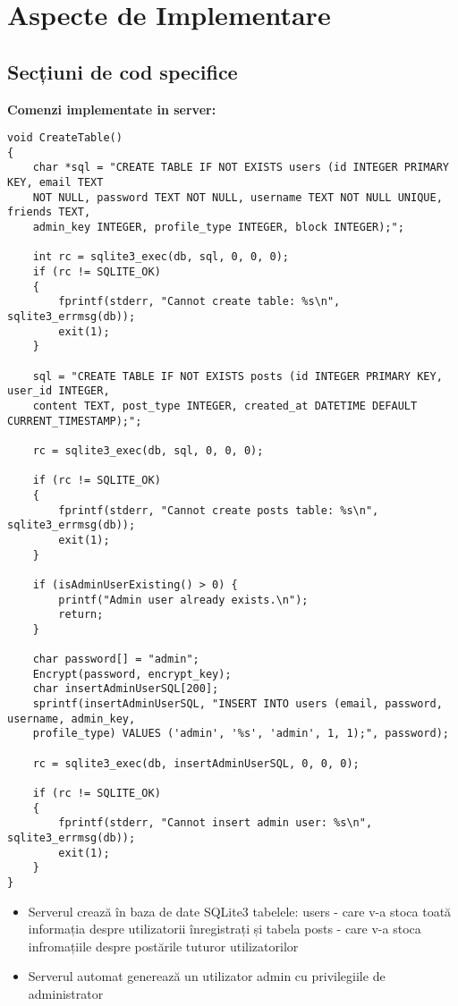 \documentclass{article}
\begin{document}
\section{Aspecte de Implementare}
\subsection{Secțiuni de cod specifice}

\begin{mdframed}
    [linewidth=1pt, linecolor=black, topline=true, rightline=true, bottomline=true, leftline=true]
    \textbf{Comenzi implementate in server:}
    \begin{verbatim}
void CreateTable()
{
    char *sql = "CREATE TABLE IF NOT EXISTS users (id INTEGER PRIMARY KEY, email TEXT
    NOT NULL, password TEXT NOT NULL, username TEXT NOT NULL UNIQUE, friends TEXT,
    admin_key INTEGER, profile_type INTEGER, block INTEGER);";

    int rc = sqlite3_exec(db, sql, 0, 0, 0);
    if (rc != SQLITE_OK)
    {
        fprintf(stderr, "Cannot create table: %s\n", sqlite3_errmsg(db));
        exit(1);
    }

    sql = "CREATE TABLE IF NOT EXISTS posts (id INTEGER PRIMARY KEY, user_id INTEGER,
    content TEXT, post_type INTEGER, created_at DATETIME DEFAULT CURRENT_TIMESTAMP);";

    rc = sqlite3_exec(db, sql, 0, 0, 0);

    if (rc != SQLITE_OK)
    {
        fprintf(stderr, "Cannot create posts table: %s\n", sqlite3_errmsg(db));
        exit(1);
    }

    if (isAdminUserExisting() > 0) {
        printf("Admin user already exists.\n");
        return;
    }

    char password[] = "admin";
    Encrypt(password, encrypt_key);
    char insertAdminUserSQL[200];
    sprintf(insertAdminUserSQL, "INSERT INTO users (email, password, username, admin_key,
    profile_type) VALUES ('admin', '%s', 'admin', 1, 1);", password);

    rc = sqlite3_exec(db, insertAdminUserSQL, 0, 0, 0);

    if (rc != SQLITE_OK)
    {
        fprintf(stderr, "Cannot insert admin user: %s\n", sqlite3_errmsg(db));
        exit(1);
    }
}
    \end{verbatim}

\end{mdframed}

\begin{itemize}
    \item Serverul crează în baza de date SQLite3 tabelele: users - care v-a stoca toată informația despre utilizatorii înregistrați și tabela posts - care v-a stoca infromațiile despre postările tuturor utilizatorilor

    \item Serverul automat generează un utilizator admin cu privilegiile de administrator
\end{itemize}
\end{document}

